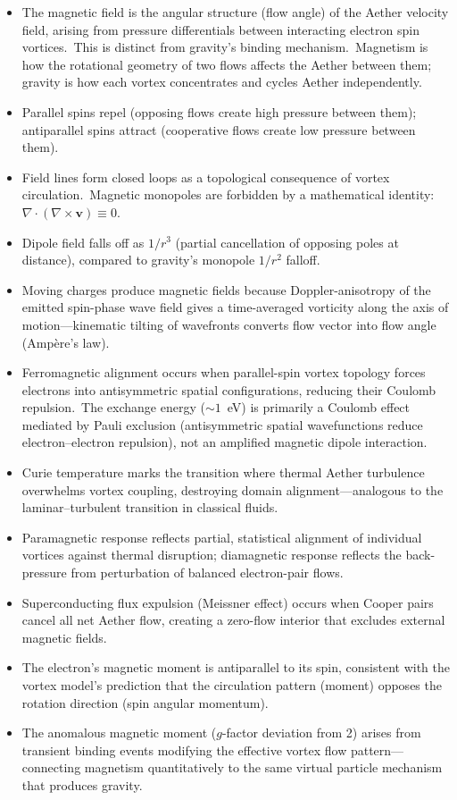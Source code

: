 ﻿\documentclass[12pt,letterpaper]{article}
\begin{document}
\begin{itemize}[leftmargin=2em]
  \item The magnetic field is the angular structure (flow angle) of the Aether velocity
    field, arising from pressure differentials between interacting electron spin vortices.\
    This is distinct from gravity's binding mechanism.\ Magnetism is how the rotational
    geometry of two flows affects the Aether between them; gravity is how each vortex
    concentrates and cycles Aether independently.
  \item Parallel spins repel (opposing flows create high pressure between them); antiparallel
    spins attract (cooperative flows create low pressure between them).
  \item Field lines form closed loops as a topological consequence of vortex circulation.\
    Magnetic monopoles are forbidden by a mathematical identity: $\nabla \cdot (\nabla
    \times \mathbf{v}) \equiv 0$.
  \item Dipole field falls off as $1/r^3$ (partial cancellation of opposing poles at distance),
    compared to gravity's monopole $1/r^2$ falloff.
  \item Moving charges produce magnetic fields because Doppler-anisotropy of the emitted
    spin-phase wave field gives a time-averaged vorticity along the axis of
    motion---kinematic tilting of wavefronts converts flow vector into flow angle
    (Amp\`ere's law).
  \item Ferromagnetic alignment occurs when parallel-spin vortex topology forces electrons
    into antisymmetric spatial configurations, reducing their Coulomb repulsion.\ The
    exchange energy (${\sim}1$~eV) is primarily a Coulomb effect mediated by
    Pauli exclusion (antisymmetric spatial wavefunctions reduce electron--electron
    repulsion), not an amplified magnetic dipole interaction.
  \item Curie temperature marks the transition where thermal Aether turbulence overwhelms
    vortex coupling, destroying domain alignment---analogous to the laminar--turbulent
    transition in classical fluids.
  \item Paramagnetic response reflects partial, statistical alignment of individual vortices
    against thermal disruption; diamagnetic response reflects the back-pressure from
    perturbation of balanced electron-pair flows.
  \item Superconducting flux expulsion (Meissner effect) occurs when Cooper pairs cancel all
    net Aether flow, creating a zero-flow interior that excludes external magnetic fields.
  \item The electron's magnetic moment is antiparallel to its spin, consistent with the
    vortex model's prediction that the circulation pattern (moment) opposes the rotation
    direction (spin angular momentum).
  \item The anomalous magnetic moment ($g$-factor deviation from 2) arises from transient binding
    events modifying the effective vortex flow pattern---connecting magnetism quantitatively
    to the same virtual particle mechanism that produces gravity.
\end{itemize}
\end{document}
